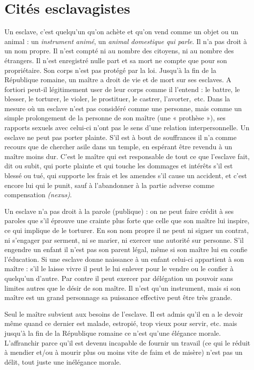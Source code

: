 
\chapter{Cités esclavagistes}

Un esclave, c'est quelqu'un qu'on achète et qu'on vend comme un
objet ou un animal : un {\emph{instrument animé}}, un {\emph{animal
domestique qui parle}}. Il n'a pas droit à un nom propre. Il n'est compté ni au nombre des citoyens,
ni au nombre des étrangers. Il n'est enregistré nulle part et sa
mort ne compte que pour son propriétaire. Son corps n'est pas protégé
par la loi. Jusqu'à la fin de la République romaine, un maître a droit de vie
et de mort sur ses esclaves. A fortiori peut-il légitimement user de leur
corps comme il l'entend : le battre, le blesser, le torturer, le violer, le
prostituer, le castrer, l'avorter,~etc. Dans la mesure où un esclave n'est
pas considéré comme une personne, mais comme un simple prolongement
de la personne de son maître (une « prothèse »), ses rapports
sexuels avec celui-ci n'ont pas le sens d'une relation interpersonnelle.
Un esclave ne peut pas porter plainte. S'il est à bout de souffrances
il n'a comme recours que de chercher asile dans un temple, en espérant
être revendu à un maître moins dur. C'est le maître qui est responsable
de tout ce que l'esclave fait, dit ou subit, qui porte plainte et qui
touche les dommages et intérêts s'il est blessé ou tué, qui supporte les
frais et les amendes s'il cause un accident, et c'est encore lui qui le punit,
sauf à l'abandonner à la partie adverse comme compensation \emph{(nexus)}.

Un esclave n'a pas droit à la parole (publique) : on ne peut faire
crédit à ses paroles que s'il éprouve une crainte plus forte que celle que
son maître lui inspire, ce qui implique de le torturer. En son nom propre
il ne peut ni signer un contrat, ni s'engager par serment, ni se marier, ni
exercer une autorité sur personne. S'il engendre un enfant il n'est pas son
parent légal, même si son maître lui en confie l'éducation. Si une esclave
donne naissance à un enfant celui-ci appartient à son maître : s'il le laisse
vivre il peut le lui enlever pour le vendre ou le confier à quelqu'un d'autre.
Par contre il peut exercer par délégation un pouvoir sans limites autres
que le désir de son maître. Il n'est qu'un instrument, mais si son maître
est un grand personnage sa puissance effective peut être très grande.

Seul le maître subvient aux besoins de l'esclave. Il est admis qu'il
en a le devoir même quand ce dernier est malade, estropié, trop vieux
pour servir, etc. mais jusqu'à la fin de la République romaine ce n'est
qu'une élégance morale. L'affranchir parce qu'il est devenu incapable de
fournir un travail (ce qui le réduit à mendier et/ou à mourir plus ou
moins vite de faim et de misère) n'est pas un délit, tout juste une inélégance
morale.

